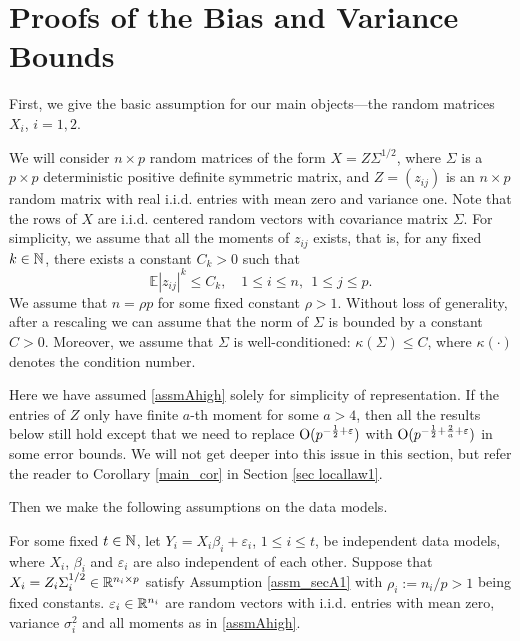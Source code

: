 \section{Proofs of the Bias and Variance Bounds} \label{sec_maintools}

First, we give the basic assumption for our main objects---the random matrices $X_i$, $i=1,2$.

\begin{assumption}\label{assm_secA1}
We will consider $n\times p$ random matrices of the form $X=Z\Sigma^{1/2}$, where $\Sigma$  is a $p\times p$ deterministic positive definite symmetric matrix, and $Z=(z_{ij})$ is an $n\times p$ random matrix with real i.i.d. entries with mean zero and variance one. Note that the rows of $X$ are i.i.d. centered random vectors with covariance matrix $\Sigma$. For simplicity, we assume that all the moments of $z_{ij}$ exists, that is, for any fixed $k\in \mathbb{N}$, there exists a constant $C_k>0$ such that
\begin{equation}\label{assmAhigh}
\mathbb{E} |z_{ij}|^k \le C_k ,\quad 1\le i \le n, \ \ 1\le j \le p.
\end{equation}
 We assume that $n=\rho p$ for some fixed constant $\rho>1$. Without loss of generality, after a rescaling we can assume that the norm of $\Sigma$ is bounded by a constant $C>0$. Moreover, we assume that $\Sigma$ is well-conditioned: $\kappa(\Sigma)\le C$, where $\kappa(\cdot)$ denotes the condition number.
\end{assumption}
Here we have assumed \eqref{assmAhigh} solely for simplicity of representation. If the entries of $Z$ only have finite $a$-th moment for some $a>4$, then all the results below still hold except that we need to replace $\operatorname{O}(p^{-\frac12+{\varepsilon}})$ with $\operatorname{O}( p^{-\frac12+\frac2a +\varepsilon})$ in some error bounds.
We will not get deeper into this issue in this section, but refer the reader to Corollary \ref{main_cor} in Section \ref{sec locallaw1}.


Then we make the following assumptions on the data models.
\begin{assumption}\label{assm_secA2}
For some fixed $t\in \mathbb{N}$, let $Y_i = X_i\beta_i + \varepsilon_i$, $1\le i \le t$, be independent data models, where $X_i$, $\beta_i$ and $\varepsilon_i$ are also independent of each other. Suppose that $X_i=Z_i\Sigma_i^{1/2}\in \mathbb{R}^{n_i\times p}$ satisfy Assumption \ref{assm_secA1} with $\rho_i:=n_i/p>1$ being fixed constants.
${\varepsilon}_i\in \mathbb{R}^{n_i}$ are random vectors with i.i.d. entries with mean zero, variance $\sigma_i^2$ and all moments as in \eqref{assmAhigh}.
\end{assumption}


